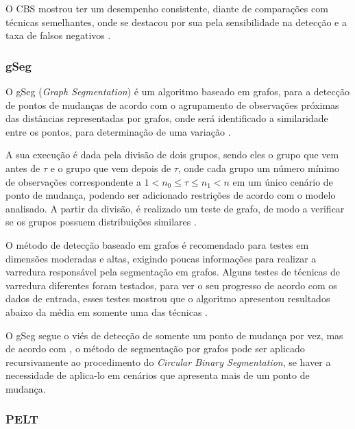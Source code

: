 O CBS mostrou ter um desempenho consistente, diante de comparações com técnicas semelhantes, onde se destacou por sua pela sensibilidade na detecção e a taxa de falsos negativos \cite{Hsu2011}.


\subsubsection{gSeg}

O gSeg (\textit{Graph Segmentation}) é um algoritmo baseado em grafos, para a detecção de pontos de mudanças de acordo com o agrupamento de observações próximas das distâncias representadas por grafos, onde será identificado a similaridade entre os pontos, para determinação de uma variação
\cite{Chen2015}.

A sua execução é dada pela divisão de dois grupos, sendo eles o grupo que vem antes de $\tau$ e o grupo que vem depois de $\tau$, onde cada grupo um número mínimo de observações correspondente a $1 < n_{0} \leq \tau \leq n_{1} < n$ em um único cenário de ponto de mudança, podendo ser adicionado restrições de acordo com o modelo analisado. A partir da divisão, é realizado um teste de grafo, de modo a verificar se os grupos possuem distribuições similares \cite{Chen2015}.

O método de detecção baseado em grafos é recomendado para testes em dimensões moderadas e altas, exigindo poucas informações para realizar a varredura responsável pela segmentação em grafos. Alguns testes de técnicas de varredura diferentes foram testados, para ver o seu progresso de acordo com os dados de entrada, esses testes mostrou que o algoritmo apresentou resultados abaixo da média em somente uma das técnicas \cite{Chen2015}.

O gSeg segue o viés de detecção de somente um ponto de mudança por vez, mas de acordo com \cite{Chen2015}, o método de segmentação por grafos pode ser aplicado recursivamente ao procedimento do \textit{Circular Binary Segmentation}, se haver a necessidade de aplica-lo em cenários que apresenta mais de um ponto de mudança.


\subsubsection{PELT}

